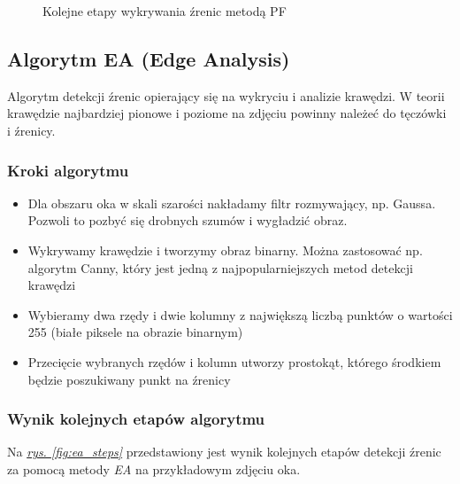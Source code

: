 \begin{figure}[!h]
\begin{center}
    \end{center}
    \caption{Kolejne etapy wykrywania źrenic metodą PF}
    \label{fig:pf_steps}
\end{figure}

\subsection{Algorytm EA (Edge Analysis)}

Algorytm detekcji źrenic \cite{EyePupilWebCam} opierający się na wykryciu i analizie krawędzi. W teorii krawędzie najbardziej pionowe i poziome na zdjęciu powinny należeć do tęczówki i źrenicy.

\subsubsection{Kroki algorytmu}

\begin{itemize}
    \item Dla obszaru oka w skali szarości nakładamy filtr rozmywający, np. Gaussa. Pozwoli to pozbyć się drobnych szumów i wygładzić obraz.
    \item Wykrywamy krawędzie i tworzymy obraz binarny. Można zastosować np. algorytm Canny, który jest jedną z najpopularniejszych metod detekcji krawędzi
    \item Wybieramy dwa rzędy i dwie kolumny z największą liczbą punktów o wartości 255 (białe piksele na obrazie binarnym)
    \item Przecięcie wybranych rzędów i kolumn utworzy prostokąt, którego środkiem będzie poszukiwany punkt na źrenicy
\end{itemize}

\subsubsection{Wynik kolejnych etapów algorytmu}
Na \hyperref[{fig:ea_steps}]{\textit{rys. \ref{fig:ea_steps}}} przedstawiony jest wynik kolejnych etapów detekcji źrenic za pomocą metody \textit{EA} na przykładowym zdjęciu oka.

